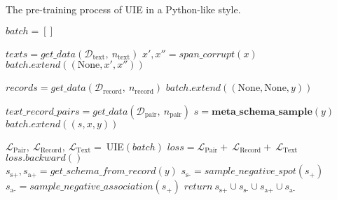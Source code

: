 \documentclass[11pt]{article}
\begin{document}
\begin{algorithm}[t]
	\caption{The pre-training process of UIE in a Python-like style.}  
	\label{alg:uie-pseudocode} 
	\begin{algorithmic}
	\small{
		\State {}
		\State $batch = []$

		\State {}
		\State $texts = get\_data(\mathcal{D}_{\text{text}},\ n_{\text{text}})$
		\State {}
		\State {}
		    \State $x', x'' = span\_corrupt(x)$
    		\State $batch.extend((\text{None}, x', x''))$
		\EndFor

		\State {}
		\State $records = get\_data(\mathcal{D}_{\text{record}},\ n_{\text{record}})$
    		\State $batch.extend((\text{None}, \text{None}, y))$
		\EndFor
		
		\State {}
		\State $text\_record\_pairs = get\_data(\mathcal{D}_{\text{pair}},\ n_{\text{pair}})$
		\State {}
		\State {}
    		\State$s = \mathbf{meta\_schema\_sample}(y)$
    		\State$batch.extend((s, x, y))$
		\EndFor

		\State {}
		\State $\mathcal{L}_{\text{Pair}},\ \mathcal{L}_{\text{Record}},\ \mathcal{L}_{\text{Text}} =\ $UIE$(batch)$
		\State $loss = \mathcal{L}_{\text{Pair}} + \ \mathcal{L}_{\text{Record}} + \ \mathcal{L}_{\text{Text}}$
		\State $loss.backward()$
		\EndFor
		\EndFunction
		\\
		\State {}
		\State {}
		\State {}
		\State $s_{\text{s+}}, s_{\text{a+}} = get\_schema\_from\_record(y)$
		\State {}
		\State $s_{\text{s-}} = sample\_negative\_spot(s_{+})$
		\State {}
		\State $s_{\text{a-}} = sample\_negative\_association(s_{+})$
		\State $return ~ s_{\text{s+}} \cup s_{\text{s-}} \cup s_{\text{a+}} \cup s_{\text{a-}}$
		\EndFunction
		
	}
	\end{algorithmic}  
\end{algorithm} 
\end{document}
